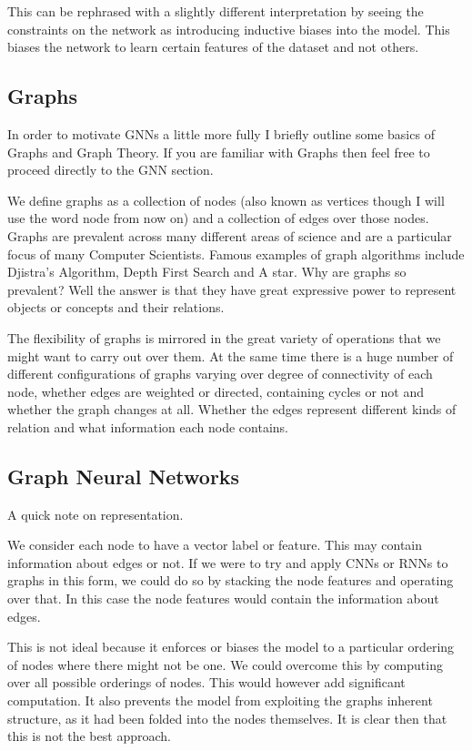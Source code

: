 \documentclass[]{../resources/final_report}
\begin{document}
This can be rephrased with a slightly different interpretation by seeing the constraints on the network as introducing inductive biases into the model. This biases the network to learn certain features of the dataset and not others. 

\subsection{Graphs}

In order to motivate GNNs a little more fully I briefly outline some basics of Graphs and Graph Theory. If you are familiar with Graphs then feel free to proceed directly to the GNN section.

We define graphs as a collection of nodes (also known as vertices though I will use the word node from now on) and a collection of edges over those nodes. Graphs are prevalent across many different areas of science and are a particular focus of many Computer Scientists. Famous examples of graph algorithms include Djistra's Algorithm, Depth First Search and A star. Why are graphs so prevalent? Well the answer is that they have great expressive power to represent objects or concepts and their relations.

The flexibility of graphs is mirrored in the great variety of operations that we might want to carry out over them. At the same time there is a huge number of different configurations of graphs varying over degree of connectivity of each node, whether edges are weighted or directed, containing cycles or not and whether the graph changes at all. Whether the edges represent different kinds of relation and what information each node contains.

\subsection{Graph Neural Networks}

A quick note on representation.

We consider each node to have a vector label or feature. This may contain information about edges or not. If we were to try and apply CNNs or RNNs to graphs in this form, we could do so by stacking the node features and operating over that. In this case the node features would contain the information about edges.

This is not ideal because it enforces or biases the model to a particular ordering of nodes where there might not be one. We could overcome this by computing over all possible orderings of nodes. This would however add significant computation. \cite{graphoverview}It also prevents the model from exploiting the graphs inherent structure, as it had been folded into the nodes themselves. It is clear then that this is not the best approach.
\end{document}
